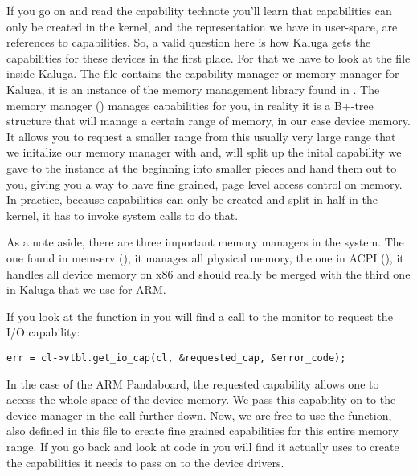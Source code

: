 \documentclass[a4paper,11pt,twoside]{report}
\begin{document}
If you go on and read the capability technote \cite{btn013-capabilities}
you'll learn that capabilities can only be created in the kernel, and the
representation we have in user-space, are references to capabilities. So, a
valid question here is how Kaluga gets the capabilities for these devices in
the first place. For that we have to look at the  file
inside Kaluga. The file contains the capability manager or memory manager for
Kaluga, it is an instance of the memory management library found in
. The memory manager () manages capabilities
for you, in reality it is a B+-tree structure that will manage a certain range
of memory, in our case device memory. It allows you to request a smaller range
from this usually very large range that we initalize our memory manager with
and,  will split up the inital capability we gave to the
instance at the beginning into smaller pieces and hand them out to you, giving
you a way to have fine grained, page level access control on memory. In
practice, because capabilities can only be created and split in half in the
kernel, it has to invoke system calls to do that.

As a note aside, there are three important memory managers in the system. The
one found in memserv (), it manages all physical memory,
the one in ACPI (), it handles all device memory on x86 and
should really be merged with the third one in Kaluga that we use for ARM.

If you look at the function  in 
you will find a call to the monitor to request the I/O capability:

\begin{lstlisting}[caption={RPC call to receive the I/O capability from
the monitor.}, label={lst:getio}]
err = cl->vtbl.get_io_cap(cl, &requested_cap, &error_code);
\end{lstlisting}

In the case of the ARM Pandaboard, the requested capability allows one to
access the whole space of the device memory. We pass this capability on to the
device manager in the  call further down. Now, we are free to
use the  function, also defined in this file to
create fine grained capabilities for this entire memory range. If you go back
and look at code in  you will find it
actually uses  to create the capabilities it needs to
pass on to the device drivers.
\end{document}
